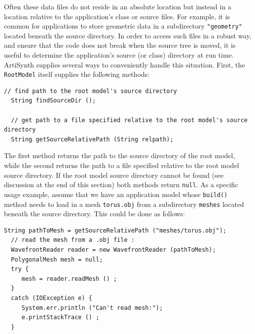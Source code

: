 Often these data files do not reside in an absolute location but
instead in a location relative to the application's class or source
files.  For example, it is common for applications to store geometric
data in a subdirectory {\tt "geometry"} located beneath the source
directory. In order to access such files in a robust way, and ensure
that the code does not break when the source tree is moved, it is
useful to determine the application's source (or class) directory at
run time. ArtiSynth supplies several ways to conveniently handle this
situation. First, the {\tt RootModel} itself supplies the following
methods:
\begin{lstlisting}[]
  // find path to the root model's source directory
  String findSourceDir ();

  // get path to a file specified relative to the root model's source directory
  String getSourceRelativePath (String relpath);
\end{lstlisting}
%
The first method returns the path to the source directory of the
root model, while the second returns the path to a file specified
relative to the root model source directory. If the root model source
directory cannot be found (see discussion at the end of this section)
both methods return {\tt null}.
%
As a specific usage example, assume that we have an application model
whose {\tt build()} method needs to load in a mesh {\tt torus.obj}
from a subdirectory {\tt meshes} located beneath the source
directory. This could be done as follows:
%
\begin{lstlisting}[]
  String pathToMesh = getSourceRelativePath ("meshes/torus.obj");
  // read the mesh from a .obj file :
  WavefrontReader reader = new WavefrontReader (pathToMesh);
  PolygonalMesh mesh = null;
  try {
     mesh = reader.readMesh () ;
  }
  catch (IOException e) {
     System.err.println ("Can't read mesh:");
     e.printStackTrace () ;
  }
\end{lstlisting}


